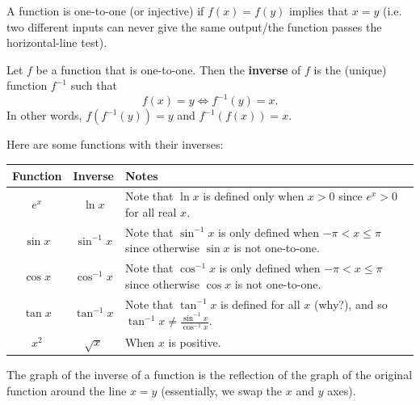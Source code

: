 


A function is one-to-one (or injective) if $ f(x) = f(y) $ implies that $ x = y $ (i.e. two different inputs can never
give the same output/the function passes the horizontal-line test).

\begin{defn}
  Let $ f $ be a function that is one-to-one. Then the \textbf{inverse} of $ f $ is the (unique) function $ f^{-1} $ such that
  \begin{displaymath}
    f(x) = y \iff f^{-1}(y) = x.
  \end{displaymath}
  In other words, $ f(f^{-1}(y)) = y $ and $ f^{-1}(f(x)) = x $.
\end{defn}

\begin{ex}
  Here are some functions with their inverses:
  \begin{center}
  \def\arraystretch{1.5}
  \begin{tabularx}{0.9\linewidth}{|c|c|X|}\hline
    \textbf{Function} & \textbf{Inverse} & \textbf{Notes}\\\hline
    $ e^x $ & $ \ln x $ & Note that $ \ln x $ is defined only when $ x > 0 $ since $ e^x > 0 $ for all real $ x $.\\
    $ \sin x $ & $ \sin^{-1} x $ & Note that $ \sin^{-1} x $ is only defined when $ -\pi < x \leq \pi $ since otherwise $ \sin x $ is not one-to-one.\\
    $ \cos x $ & $ \cos^{-1} x $ & Note that $ \cos^{-1} x $ is only defined when $ -\pi < x \leq \pi $ since otherwise $ \cos x $ is not one-to-one.\\
    $ \tan x $ & $ \tan^{-1} x $ & Note that $ \tan^{-1} x $ is defined for all $ x $ (why?), and so $ \tan^{-1} x \neq \frac{\sin^{-1} x}{\cos^{-1} x} $.\\
    $ x^2 $ & $ \sqrt{x} $ & When $ x $ is positive.\\\hline
  \end{tabularx}
  \end{center}
\end{ex}
The graph of the inverse of a function is the reflection of the graph of the original function around the line $ x = y $ (essentially, we swap
the $ x $ and $ y $ axes).

